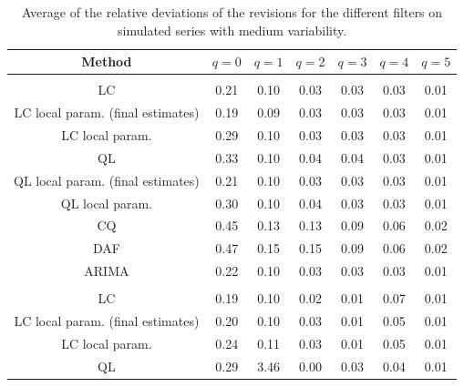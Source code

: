 \documentclass[
]{article}
\newcommand\1{\mathds{1}}
\begin{document}
\begin{table}[!h]
\caption{\label{tab-simulrev} Average of the relative deviations of the revisions for the different
filters on simulated series with medium variability.}
\centering
\begin{tabular}{ccccccc}
\toprule
Method & $q=0$ & $q=1$ & $q=2$ & $q=3$ & $q=4$ & $q=5$\\
\midrule
\addlinespace[0.3em]
\multicolumn{7}{l}{\textbf{$MAE_{fe}(q) = \mathbb E\left[\left|(y_{t|t+q} -  y_{t|last})/y_{t|last}\right|\right]$}}\\
\hspace{1em}LC & 0.21 & 0.10 & 0.03 & 0.03 & 0.03 & 0.01\\
\hspace{1em}LC local param. (final estimates) & 0.19 & 0.09 & 0.03 & 0.03 & 0.03 & 0.01\\
\hspace{1em}LC local param. & 0.29 & 0.10 & 0.03 & 0.03 & 0.03 & 0.01\\
\hspace{1em}QL & 0.33 & 0.10 & 0.04 & 0.04 & 0.03 & 0.01\\
\hspace{1em}QL local param. (final estimates) & 0.21 & 0.10 & 0.03 & 0.03 & 0.03 & 0.01\\
\hspace{1em}QL local param. & 0.30 & 0.10 & 0.04 & 0.03 & 0.03 & 0.01\\
\hspace{1em}CQ & 0.45 & 0.13 & 0.13 & 0.09 & 0.06 & 0.02\\
\hspace{1em}DAF & 0.47 & 0.15 & 0.15 & 0.09 & 0.06 & 0.02\\
\hspace{1em}ARIMA & 0.22 & 0.10 & 0.03 & 0.03 & 0.03 & 0.01\\
\addlinespace[0.3em]
\multicolumn{7}{l}{\textbf{$MAE_{ce}(q)=\mathbb E\left[
\left|(y_{t|t+q} - y_{t|t+q+1})/y_{t|t+q+1}\right|
\right]$}}\\
\hspace{1em}LC & 0.19 & 0.10 & 0.02 & 0.01 & 0.07 & 0.01\\
\hspace{1em}LC local param. (final estimates) & 0.20 & 0.10 & 0.03 & 0.01 & 0.05 & 0.01\\
\hspace{1em}LC local param. & 0.24 & 0.11 & 0.03 & 0.01 & 0.05 & 0.01\\
\hspace{1em}QL & 0.29 & 3.46 & 0.00 & 0.03 & 0.04 & 0.01\\

\end{tabular}
\end{table}
\end{document}
